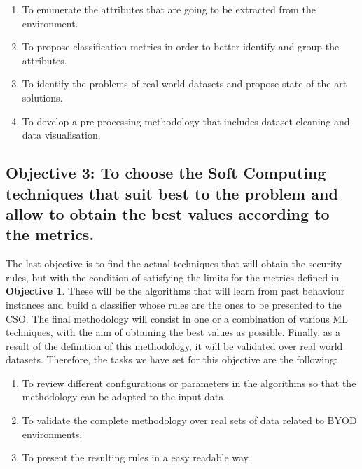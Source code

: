 \begin{enumerate}
	\item To enumerate the attributes that are going to be extracted from the environment.
	\item To propose classification metrics in order to better identify and group the attributes.
	\item To identify the problems of real world datasets and propose state of the art solutions.
	\item To develop a pre-processing methodology that includes dataset cleaning and data visualisation.
\end{enumerate}


\newcommand{\objectivetechniques}{To choose the Soft Computing techniques that suit best to the problem and allow to obtain the best values according to the metrics.} 

\subsection*{Objective 3: \objectivetechniques}
\label{subsec:intro:obj:fwork} 

The last objective is to find the actual techniques that will obtain the security rules, but with the condition of satisfying the limits for the metrics defined in \textbf{Objective 1}. These will be the algorithms that will learn from past behaviour instances and build a classifier whose rules are the ones to be presented to the CSO. The final methodology will consist in one or a combination of various ML techniques, with the aim of obtaining the best values as possible. Finally, as a result of the definition of this methodology, it will be validated over real world datasets. Therefore, the tasks we have set for this objective are the following:

\begin{enumerate}
	\item To review different configurations or parameters in the algorithms so that the methodology can be adapted to the input data.
	\item To validate the complete methodology over real sets of data related to BYOD environments. %
	\item To present the resulting rules in a easy readable way.
\end{enumerate}


